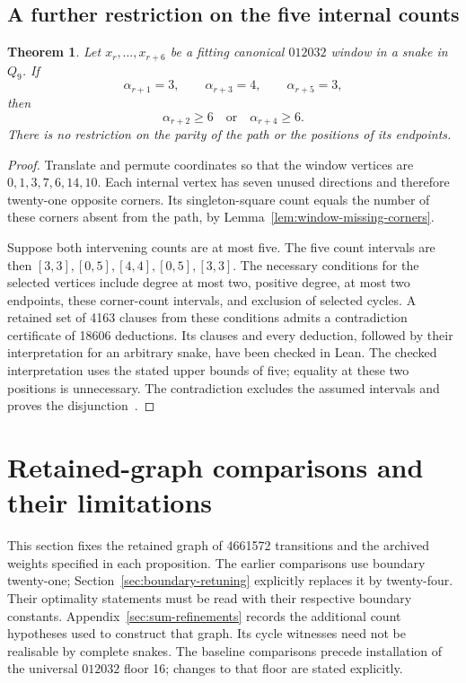 \documentclass[11pt,a4paper]{article}
\newtheorem{theorem}{Theorem}[section]
\theoremstyle{definition}
\theoremstyle{remark}
\newcommand{\Q}{Q}
\begin{document}
\subsection{A further restriction on the five internal counts}\label{sec:five-count-exclusion}
\begin{theorem}\label{thm:alternate-three-four-three}
Let $x_r,\ldots,x_{r+6}$ be a fitting canonical $012032$ window in a snake
in $\Q_9$. If
\[
\alpha_{r+1}=3,\qquad \alpha_{r+3}=4,\qquad \alpha_{r+5}=3,
\]
then
\[
\alpha_{r+2}\ge6\quad\text{or}\quad\alpha_{r+4}\ge6.
\]
There is no restriction on the parity of the path or the positions of its endpoints.
\end{theorem}
\begin{proof}
Translate and permute coordinates so that the window vertices are
$0,1,3,7,6,14,10$. Each internal vertex has seven unused directions and
therefore twenty-one opposite corners. Its singleton-square count equals
the number of these corners absent from the path, by
Lemma~\ref{lem:window-missing-corners}.

Suppose both intervening counts are at most five. The five count intervals
are then $[3,3],[0,5],[4,4],[0,5],[3,3]$. The necessary conditions for the
selected vertices include degree at most two, positive degree, at most two
endpoints, these corner-count intervals, and exclusion of selected cycles.
A retained set of 4163 clauses from these conditions admits a contradiction
certificate of 18606 deductions. Its clauses and every deduction, followed
by their interpretation for an arbitrary snake, have been checked in Lean.
The checked interpretation uses the stated upper bounds of five; equality
at these two positions is unnecessary. The contradiction excludes the
assumed intervals and proves the disjunction~\cite{fivecount140archive}.
\end{proof}

\section{Retained-graph comparisons and their limitations}\label{sec:current-limitations}
This section fixes the retained graph of 4661572 transitions and the
archived weights specified in each proposition. The earlier comparisons
use boundary twenty-one; Section~\ref{sec:boundary-retuning} explicitly
replaces it by twenty-four. Their optimality statements must be read with
their respective boundary constants.
Appendix~\ref{sec:sum-refinements} records the additional count hypotheses
used to construct that graph. Its cycle witnesses need not be realisable
by complete snakes. The baseline comparisons precede installation of the
universal $012032$ floor 16; changes to that floor are stated explicitly.
\end{document}
